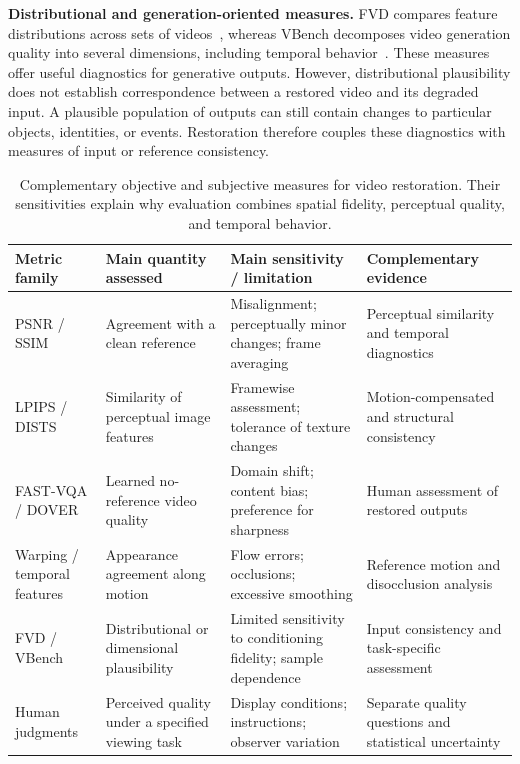 \textbf{Distributional and generation-oriented measures.} FVD compares feature distributions across sets of videos~\cite{fvd}, whereas VBench decomposes video generation quality into several dimensions, including temporal behavior~\cite{vbench}. These measures offer useful diagnostics for generative outputs. However, distributional plausibility does not establish correspondence between a restored video and its degraded input. A plausible population of outputs can still contain changes to particular objects, identities, or events. Restoration therefore couples these diagnostics with measures of input or reference consistency.

\begin{table}[t]
\caption{Complementary objective and subjective measures for video restoration. Their sensitivities explain why evaluation combines spatial fidelity, perceptual quality, and temporal behavior.}
\label{tab:metrics}\centering\footnotesize
\begin{tabularx}{\textwidth}{@{}p{}YYY@{}}\toprule
Metric family & Main quantity assessed & Main sensitivity / limitation & Complementary evidence \\\midrule
PSNR / SSIM & Agreement with a clean reference & Misalignment; perceptually minor changes; frame averaging & Perceptual similarity and temporal diagnostics \\
LPIPS / DISTS~\cite{lpips,dists} & Similarity of perceptual image features & Framewise assessment; tolerance of texture changes & Motion-compensated and structural consistency \\
FAST-VQA / DOVER~\cite{fastvqa,dover} & Learned no-reference video quality & Domain shift; content bias; preference for sharpness & Human assessment of restored outputs \\
Warping / temporal features & Appearance agreement along motion & Flow errors; occlusions; excessive smoothing & Reference motion and disocclusion analysis \\
FVD / VBench~\cite{fvd,vbench} & Distributional or dimensional plausibility & Limited sensitivity to conditioning fidelity; sample dependence & Input consistency and task-specific assessment \\
Human judgments & Perceived quality under a specified viewing task & Display conditions; instructions; observer variation & Separate quality questions and statistical uncertainty \\\bottomrule
\end{tabularx}
\end{table}

